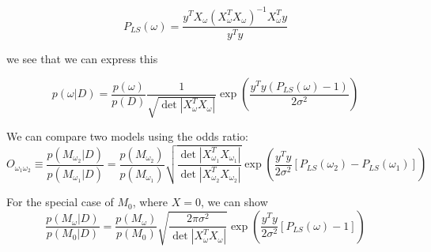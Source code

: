 \documentclass[12pt,pdftex]{article}
\begin{document}
\begin{equation}
  P_{LS}(\omega) = \frac{y^TX_\omega(X_\omega^TX_\omega)^{-1}X_\omega^Ty}{y^Ty}
\end{equation}

we see that we can express this

\begin{equation}
  p(\omega|D) = \frac{p(\omega)}{p(D)}\frac{1}{\sqrt{\det|X_\omega^TX_\omega|}}
  \exp\left(\frac{y^Ty(P_{LS}(\omega) - 1)}{2\sigma^2}\right)
\end{equation}

We can compare two models using the odds ratio:
\begin{equation}
  O_{\omega_1\omega_2} \equiv \frac{p(M_{\omega_2}|D)}{p(M_{\omega_1}|D)}
  =\frac{p(M_{\omega_2})}{p(M_{\omega_1})}\sqrt{\frac{\det|X_{\omega_1}^TX_{\omega_1}|}{\det|X_{\omega_2}^TX_{\omega_2}|}}\exp\left(\frac{y^Ty}{2\sigma^2}\left[P_{LS}(\omega_2) - P_{LS}(\omega_1)\right]\right)
\end{equation}

For the special case of $M_0$, where $X = 0$, we can show
\begin{equation}
\frac{p(M_{\omega}|D)}{p(M_0|D)} =
\frac{p(M_{\omega})}{p(M_0)}\sqrt{\frac{2\pi\sigma^2}{\det|X_\omega^TX_\omega|}}\exp\left(\frac{y^Ty}{2\sigma^2}\left[P_{LS}(\omega) - 1\right]\right)
\end{equation}
\end{document}
